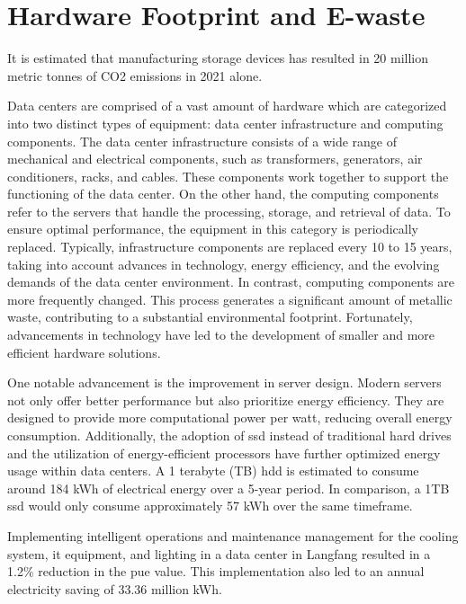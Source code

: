 \documentclass[
  a4paper,  %
  twoside,  %
  bibliography=totoc,
  headsepline,
  cleardoublepage=empty,
  parskip=half,
  draft=false
]{scrbook}
\begin{document}
\chapter{Hardware Footprint and E-waste}\label{chap5}
It is estimated that manufacturing storage devices has resulted in 20 million metric tonnes of CO2 emissions in 2021 alone\cite{networkworldHDDsGreener}.

Data centers are comprised of a vast amount of hardware which are categorized into two distinct types of equipment: data center infrastructure and computing components. The data center infrastructure consists of a wide range of mechanical and electrical components, such as transformers, generators, air conditioners, racks, and cables. These components work together to support the functioning of the data center. On the other hand, the computing components refer to the servers that handle the processing, storage, and retrieval of data. To ensure optimal performance, the equipment in this category is periodically replaced. Typically, infrastructure components are replaced every 10 to 15 years, taking into account advances in technology, energy efficiency, and the evolving demands of the data center environment\cite{samaye2024energy}. In contrast, computing components are more frequently changed. This process generates a significant amount of metallic waste, contributing to a substantial environmental footprint. Fortunately, advancements in technology have led to the development of smaller and more efficient hardware solutions.  

One notable advancement is the improvement in server design\cite{hoorn2016improving}. Modern servers not only offer better performance but also prioritize energy efficiency. They are designed to provide more computational power per watt, reducing overall energy consumption. Additionally, the adoption of \gls{ssd} instead of traditional hard drives and the utilization of energy-efficient processors have further optimized energy usage within data centers. A 1 terabyte (TB) \gls{hdd} is estimated to consume around 184 kWh of electrical energy over a 5-year period. In comparison, a 1TB \gls{ssd} would only consume approximately 57 kWh over the same timeframe\cite{networkworldHDDsGreener}. 

Implementing intelligent operations and maintenance management for the cooling system, \gls{it} equipment, and lighting in a data center in Langfang resulted in a 1.2\% reduction in the \gls{pue} value. This implementation also led to an annual electricity saving of 33.36 million kWh\cite{li2023china}.
\end{document}

